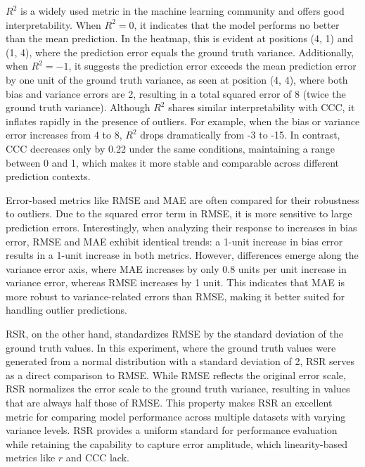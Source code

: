 $R^2$ is a widely used metric in the machine learning community and offers good interpretability. When $R^2 = 0$, it indicates that the model performs no better than the mean prediction. In the heatmap, this is evident at positions (4, 1) and (1, 4), where the prediction error equals the ground truth variance. Additionally, when $R^2 = -1$, it suggests the prediction error exceeds the mean prediction error by one unit of the ground truth variance, as seen at position (4, 4), where both bias and variance errors are 2, resulting in a total squared error of 8 (twice the ground truth variance). Although $R^2$ shares similar interpretability with CCC, it inflates rapidly in the presence of outliers. For example, when the bias or variance error increases from 4 to 8, $R^2$ drops dramatically from -3 to -15. In contrast, CCC decreases only by 0.22 under the same conditions, maintaining a range between 0 and 1, which makes it more stable and comparable across different prediction contexts.

Error-based metrics like RMSE and MAE are often compared for their robustness to outliers. Due to the squared error term in RMSE, it is more sensitive to large prediction errors. Interestingly, when analyzing their response to increases in bias error, RMSE and MAE exhibit identical trends: a 1-unit increase in bias error results in a 1-unit increase in both metrics. However, differences emerge along the variance error axis, where MAE increases by only 0.8 units per unit increase in variance error, whereas RMSE increases by 1 unit. This indicates that MAE is more robust to variance-related errors than RMSE, making it better suited for handling outlier predictions.

RSR, on the other hand, standardizes RMSE by the standard deviation of the ground truth values. In this experiment, where the ground truth values were generated from a normal distribution with a standard deviation of 2, RSR serves as a direct comparison to RMSE. While RMSE reflects the original error scale, RSR normalizes the error scale to the ground truth variance, resulting in values that are always half those of RMSE. This property makes RSR an excellent metric for comparing model performance across multiple datasets with varying variance levels. RSR provides a uniform standard for performance evaluation while retaining the capability to capture error amplitude, which linearity-based metrics like $r$ and CCC lack.
